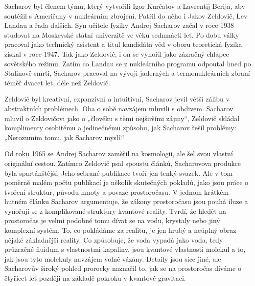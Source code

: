   Sacharov byl členem týmu, který vytvořili Igor Kurčatov a Lavrentij Berija, aby soutěžil s
  Američany v nukleárním zbrojení. Patřil do něho i Jakov Zeldovič, Lev Landau a řada dalších. Syn
  učitele fyziky Andrej Sacharov začal v roce 1938 studovat na Moskevské státní univerzitě ve věku
  sedmnácti let. Po dobu války pracoval jako technický asistent a titul kandidáta věd v oboru
  teoretická fyzika získal v roce 1947. Tak jako Zeldovič, i on se vynořil jako zázračný chlapec
  sovětského režimu. Zatím co Landau se z nukleárního programu odpoutal hned po Stalinově smrti,
  Sacharov pracoval na vývoji jaderných a termonukleárních zbraní téměř dvacet let, déle než
  Zeldovič. 
  
  Zeldovič byl kreativní, expanzivní a intuitivní, Sacharov jevil větší zálibu v abstraktních
  problémech. Oba o sobě navzájem mluvili s obdivem. Sacharov mluvil o Zeldovičovi jako o „člověku s
  těmi nejširšími zájmy“, Zeldovič skládal komplimenty osobitému a jedinečnému způsobu, jak Sacharov
  řešil problémy: „Nerozumím tomu, jak Sacharov myslí.“
  
  Od roku 1965 se Andrej Sacharov zaměřil na kosmologii, ale šel svou vlastní originální cestou.
  Zatímco Zeldovič psal spoustu článků, Sacharovova produkce byla spartánštější. Jeho sebrané
  publikace tvoří jen tenký svazek. Ale v tom poměrně malém počtu publikací je několik skutečných
  pokladů, jako jsou práce o tvoření struktur, původu hmoty a povaze prostoročasu. V jednom krátkém
  hutném článku Sacharov argumentuje, že zákony prostoročasu jsou pouhá iluze a vynořují se z
  komplikované struktury kvantové reality. Tvrdí, že hledět na prostoročas je velmi podobné tomu
  dívat se na vodu, krystaly nebo jiný komplexní systém. To, co pokládáme za realitu, je jen hrubý a
  neúplný obraz nějaké základnější reality. Co způsobuje, že voda vypadá jako voda, tedy průzračné
  fluidum s vlastnostmi kapaliny, jsou kvantové vlastnosti molekul a to, jak jsou tyto molekuly
  navzájem volně vázány. Detaily jsou sice jiné, ale Sacharovův široký pohled prorocky naznačil to,
  jak se na prostoročas díváme o čtyřicet let později na základě pokroku v kvantové gravitaci.
  
